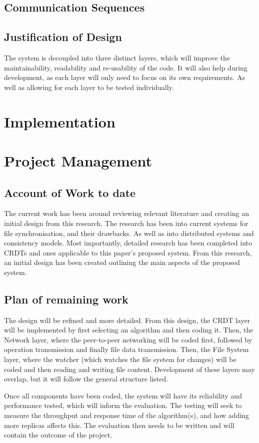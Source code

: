 \documentclass[12pt]{report}
\begin{document}
\section{Communication Sequences}



\section{Justification of Design}
The system is decoupled into three distinct layers, which will improve the maintainability, readability and re-usability of the code. It will also help during development, as each layer will only need to focus on its own requirements. As well as allowing for each layer to be tested individually. \par


\chapter{Implementation}\label{sec:implementation}

\chapter{Project Management}

\section{Account of Work to date}
The current work has been around reviewing relevant literature and creating an initial design from this research. The research has been into current systems for file synchronisation, and their drawbacks. As well as into distributed systems and consistency models. Most importantly, detailed research has been completed into CRDTs and ones applicable to this paper's proposed system. From this research, an initial design has been created outlining the main aspects of the proposed system.

\section{Plan of remaining work}
The design will be refined and more detailed. From this design, the CRDT layer will be implemented by first selecting an algorithm and then coding it. Then, the Network layer, where the peer-to-peer networking will be coded first, followed by operation transmission and finally file data transmission. Then, the File System layer, where the watcher (which watches the file system for changes) will be coded and then reading and writing file content. Development of these layers may overlap, but it will follow the general structure listed. \par
Once all components have been coded, the system will have its reliability and performance tested, which will inform the evaluation. The testing will seek to measure the throughput and response time of the algorithm(s), and how adding more replicas affects this. The evaluation then needs to be written and will contain the outcome of the project.
\end{document}
